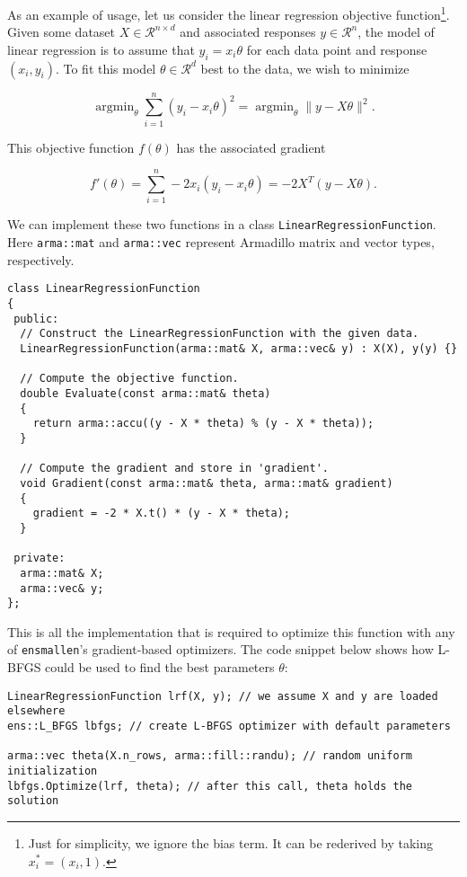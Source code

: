 \documentclass{article}
\begin{document}
As an example of usage, let us consider the linear regression objective
function\footnote{Just for simplicity, we ignore the bias term.  It can be
rederived by taking $x^*_i = (x_i, 1)$.}.  Given some dataset $X \in
\mathcal{R}^{n \times d}$ and associated responses $y \in \mathcal{R}^n$, the
model of linear regression is to assume that $y_i = x_i \theta$ for each data
point and response $(x_i, y_i)$.  To fit this model $\theta \in \mathcal{R}^d$ best
to the data, we wish to minimize

\begin{equation}
\operatorname{argmin}_\theta \sum_{i = 1}^n (y_i - x_i \theta)^2 =
\operatorname{argmin}_\theta \| y - X \theta \|^2.
\end{equation}

This objective function $f(\theta)$ has the associated gradient

\begin{equation}
f'(\theta) = \sum_{i = 1}^n -2 x_i (y_i - x_i \theta) = -2 X^T (y - X \theta).
\end{equation}

We can implement these two functions in a class {\tt LinearRegressionFunction}.
Here {\tt arma::mat} and {\tt arma::vec} represent Armadillo matrix and vector
types, respectively. %

\begin{verbatim}
class LinearRegressionFunction
{
 public:
  // Construct the LinearRegressionFunction with the given data.
  LinearRegressionFunction(arma::mat& X, arma::vec& y) : X(X), y(y) {}

  // Compute the objective function.
  double Evaluate(const arma::mat& theta)
  {
    return arma::accu((y - X * theta) % (y - X * theta));
  }

  // Compute the gradient and store in 'gradient'.
  void Gradient(const arma::mat& theta, arma::mat& gradient)
  {
    gradient = -2 * X.t() * (y - X * theta);
  }

 private:
  arma::mat& X;
  arma::vec& y;
};
\end{verbatim}

This is all the implementation that is required to optimize this function with
any of {\tt ensmallen}'s gradient-based optimizers.  The code snippet below
shows how L-BFGS could be used to find the best parameters $\theta$:

\begin{verbatim}
LinearRegressionFunction lrf(X, y); // we assume X and y are loaded elsewhere
ens::L_BFGS lbfgs; // create L-BFGS optimizer with default parameters

arma::vec theta(X.n_rows, arma::fill::randu); // random uniform initialization
lbfgs.Optimize(lrf, theta); // after this call, theta holds the solution
\end{verbatim}
\end{document}
